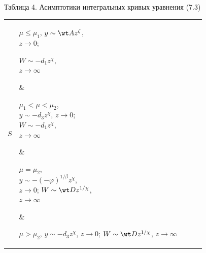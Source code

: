 \begin{center} 


Таблица 4. Асимптотики интегральных кривых уравнения (7.3) 


\begin{tabular}{|p{0.7cm}|p{3.4cm}|p{3.4cm}|p{3.4cm}|p{3.4cm}|} 


\hline 


$S$ & \parbox{3.3cm}{$\mu\le\mu_1$, $y\sim\wt Az^\zeta$,\\ $z\to0$; 


$W\sim-d_1z^\chi$,\\ $z\to\infty$} & \parbox{3.3cm}{$\mu_1<\mu<\mu_2$, \\


$y\sim-d_3z^\chi$, $z\to0$;\\ $W\sim-d_1z^\chi$,\\ $z\to\infty$} & 


\parbox{3.3cm}{$\mu=\mu_2$,\\ $y\sim-(-\varphi)^{1/\beta}z^\chi$, \\


$z\to0$; $W\sim\wt Dz^{1/\chi}$,\\ $z\to \infty$} & 


\parbox{3.3cm}{$\mu>\mu_2$, $y\sim-d_3z^\chi$, $z\to0$; $W\sim\wt 


Dz^{1/\chi}$, $z\to\infty$}\\ 


\hline 


$L_1$ & \parbox{3.3cm}{$y\sim Az^\zeta$, $z\to0$, 


$A=A(z_0)>\wt A$; $y\sim R^-_0(d_2)$,\\ $z{\to} z_0{-}0$, 


$y{\to} y_0{-}0$} & \parbox{3.3cm}{$y\sim k_1z$,\\ $z\to0$; 


$y\sim R^-_0(d_2)$,\\ $z{\to} z_0{-}0$, $y{\to} y_0{-}0$} & 


\parbox{3.3cm}{$y\sim R^-_0(l_0)$, $z\to z_0+0$, 


$y\to y_0-0$; $W{\sim} Dz^{1/\chi}$, $z{\to}\infty$, 


$D=D(z_0)>\wt D$} & 


\parbox{3.3cm}{$y\sim R^-_0(d_2)$, $z\to z_0+0$, 


$y\to y_0-0$; $W{\sim} Dz^{1/\chi}$, $z{\to}\infty$, 


$D=D(z_0)>\wt D$} \\ 


\hline 



\end{tabular}
\end{center}
